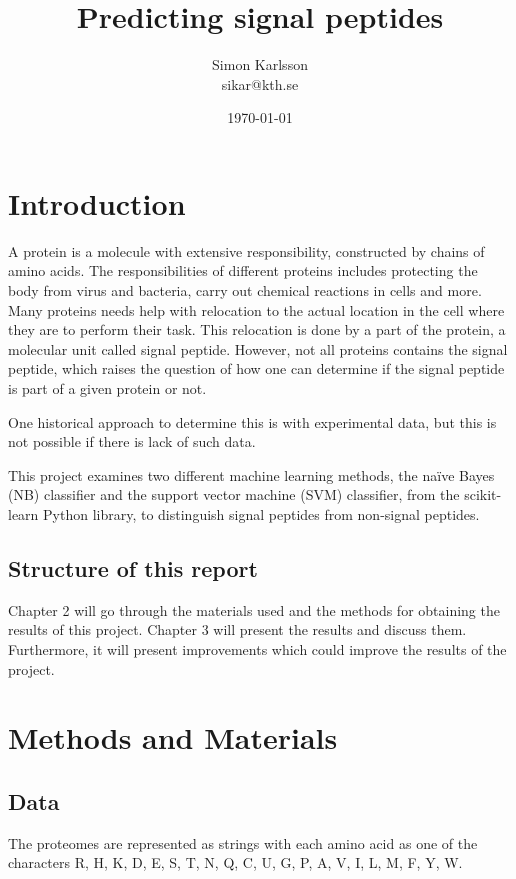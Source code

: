 \documentclass[10pt]{article}
\title{Predicting signal peptides}
\author{Simon Karlsson \\ sikar@kth.se}
\date{\today}
\begin{document}
\maketitle

\section{Introduction}
A protein is a molecule with extensive responsibility, constructed by chains of amino acids.
The responsibilities of different proteins includes protecting the body from virus and bacteria, carry out chemical reactions in cells and more\cite{website:ghr}.
Many proteins needs help with relocation to the actual location in the cell where they are to perform their task.
This relocation is done by a part of the protein, a molecular unit called signal peptide.
However, not all proteins contains the signal peptide\cite{website:project-description}, which raises the question of how one can determine if the signal peptide is part of a given protein or not.

One historical approach to determine this is with experimental data\cite{website:project-description}, but this is not possible if there is lack of such data.

This project examines two different machine learning methods, the naïve Bayes (NB) classifier and the support vector machine (SVM) classifier, from the scikit-learn Python library, to distinguish signal peptides from non-signal peptides.

\subsection{Structure of this report}
Chapter 2 will go through the materials used and the methods for obtaining the results of this project.
Chapter 3 will present the results and discuss them.
Furthermore, it will present improvements which could improve the results of the project.

\section{Methods and Materials}

\subsection{Data}
The proteomes are represented as strings with each amino acid as one of the characters R, H, K, D, E, S, T, N, Q, C, U, G, P, A, V, I, L, M, F, Y, W.
\end{document}
